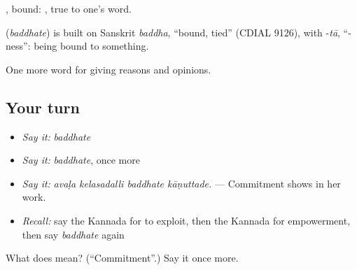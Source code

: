 , bound:  , true to one's word.

\begin{cousinweb}
\textbf{} (\emph{baddhate}) is built on Sanskrit \emph{baddha}, \textquotedblleft{}bound, tied\textquotedblright{} (CDIAL 9126), with -\emph{tā}, \textquotedblleft{}-ness\textquotedblright{}: being bound to something.
\end{cousinweb}

\begin{grammarlens}[title={What you've built}]
One more word for giving reasons and opinions.
\end{grammarlens}

\subsection*{Your turn}
\begin{itemize}
\raggedright
  \item \emph{Say it:} \emph{baddhate}
  \item \emph{Say it:} \emph{baddhate}, once more
  \item \emph{Say it:} \emph{avaḷa kelasadalli baddhate kāṇuttade.} — Commitment shows in her work.
  \item \emph{Recall:} say the Kannada for to exploit, then the Kannada for empowerment, then say \emph{baddhate} again
\end{itemize}

\begin{tcolorbox}[breakable,colback=teal!4,colframe=teal!35!black,title={Before you move on}]
What does  mean? (\textquotedblleft{}Commitment\textquotedblright{}.) Say it once more.
\end{tcolorbox}
